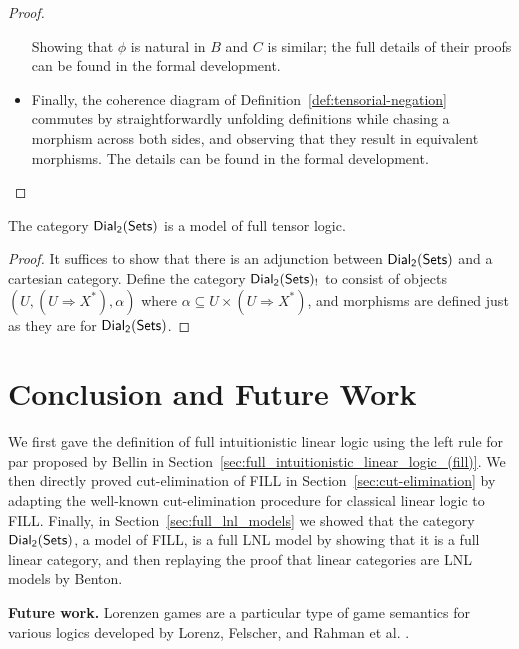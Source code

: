 \begin{proof}
\begin{itemize}
    Showing that $\phi$ is natural in $B$ and $C$ is similar; the full
    details of their proofs can be found in the formal development.

  \item Finally, the coherence diagram of
    Definition~\ref{def:tensorial-negation} commutes by
    straightforwardly unfolding definitions while chasing a morphism
    across both sides, and observing that they result in equivalent
    morphisms.  The details can be found in the formal development.
  \end{itemize}
\end{proof}

\begin{lemma}
  \label{lemma:full-tensorial-logic}
  The category $\mathsf{Dial_2}(\mathsf{Sets})$ is a model of full tensor logic.
\end{lemma}
\begin{proof}
  It suffices to show that there is an adjunction between $\mathsf{Dial_2}(\mathsf{Sets})$ and
  a cartesian category.  Define the category $\mathsf{Dial_2}(\mathsf{Sets})_!$ to consist of
  objects $(U , (U \Rightarrow X^*), \alpha)$ where $\alpha \subseteq
  U \times (U \Rightarrow X^*)$, and morphisms are defined just as
  they are for $\mathsf{Dial_2}(\mathsf{Sets})$. 
\end{proof}


\section{Conclusion and Future Work}
\label{sec:conclusion_and_future_work}

We first gave the definition of full intuitionistic linear logic using
the left rule for par proposed by Bellin in
Section~\ref{sec:full_intuitionistic_linear_logic_(fill)}.  We then
directly proved cut-elimination of FILL in
Section~\ref{sec:cut-elimination} by adapting the well-known
cut-elimination procedure for classical linear logic to FILL.
Finally, in Section~\ref{sec:full_lnl_models} we showed that the
category $\mathsf{Dial_2}(\mathsf{Sets})$, a model of FILL, is a full LNL model by showing that
it is a full linear category, and then replaying the proof that linear
categories are LNL models by Benton.

\textbf{Future work.} Lorenzen games are a particular type of game
semantics for various logics developed by Lorenz, Felscher, and Rahman
et al. \cite{Keiff:2011,Rahman:2005}. %

